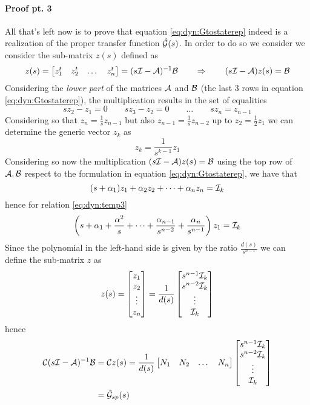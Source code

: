 		\paragraph{Proof pt. 3} All that's left now is to prove that equation \ref{eq:dyn:Gtostaterep} indeed is a realization of the proper transfer function $\hat {\mathcal{G}}(s)$. In order to do so we consider we consider the sub-matrix $z(s)$ defined as
		\[ z(s) = \begin{bmatrix} z_1^t & z_2^t & \dots & z_n^t \end{bmatrix} = (s\mathcal{I} - \mathcal{A})^{-1} \mathcal{B} \qquad \Rightarrow \qquad (s\mathcal{I}-\mathcal{A}) z(s) = \mathcal{B} \]
		Considering the \textit{lower part} of the matrices $\mathcal{A}$ and $\mathcal{B}$ (the last 3 rows in equation \ref{eq:dyn:Gtostaterep}), the multiplication results in the set of equalities
		\[ s z_2 -z_1 = 0 \qquad sz_3 - z_2 = 0 \qquad \dots \qquad sz_n = z_{n-1} \]
		Considering so that $z_n = \frac 1 s z_{n-1}$ but also $z_{n-1} = \frac 1 s z_{n-2}$ up to $z_2 = \frac 1 2 z_1$ we can determine the generic vector $z_k$ as
		\begin{equation} \label{eq:dyn:temp3}
			z_k = \frac 1{s^{k-1}} z_1
		\end{equation}
		Considering so now the multiplication $(s\mathcal{I} - \mathcal{A})z(s) = \mathcal{B}$ using the top row of $\mathcal{A},\mathcal{B}$ respect to the formulation in equation \ref{eq:dyn:Gtostaterep}, we have that
		\[ (s+\alpha_1) z_1 + \alpha_2 z_2 + \dots + \alpha_n z_n = \mathcal{I}_k \]
		hence for relation \ref{eq:dyn:temp3}
		\[ \left( s + \alpha_1 + \frac{\alpha^2}{s} + \dots + \frac{\alpha_{n-1}}{s^{n-2}} + \frac{\alpha_n}{s^{n-1}} \right) z_1 = \mathcal{I}_k \]
		Since the polynomial in the left-hand side is given by the ratio $\frac{d(s)}{s^{n-1}}$ we can define the sub-matrix $z$ as
		\[ z(s) = \begin{bmatrix} z_1 \\ z_2 \\ \vdots \\ z_n \end{bmatrix} = \frac 1 {d(s)} \begin{bmatrix} s^{n-1}\mathcal{I}_k \\ s^{n-2}\mathcal{I}_k \\ \vdots \\ \mathcal{I}_k \end{bmatrix} \]
		hence
		\begin{align*}
			\mathcal{C}(s\mathcal{I}-\mathcal{A})^{-1} \mathcal{B} & = \mathcal{C} z(s) = \frac 1{d(s)} \begin{bmatrix} N_1 & N_2 & \dots  & N_n \end{bmatrix} \begin{bmatrix} s^{n-1}\mathcal{I}_k \\ s^{n-2}\mathcal{I}_k \\ \vdots \\ \mathcal{I}_k \end{bmatrix} \\
			& = \hat {\mathcal{G}}_{sp}(s)
		\end{align*}
		
